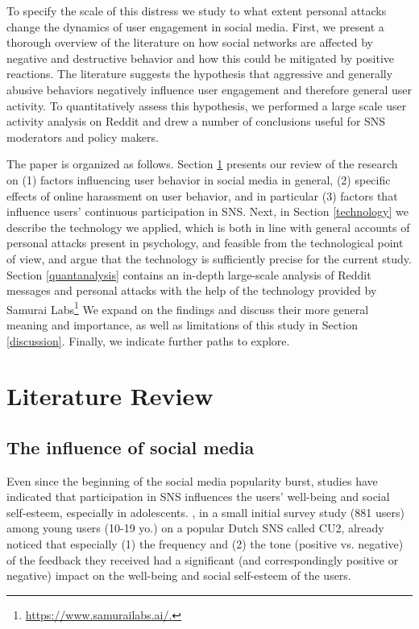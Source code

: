 \documentclass[a4paper,fleqn]{cas-dc}
\begin{document}
To specify the scale of this distress we study to what extent personal attacks change the dynamics of user engagement in social media. 
First, we present a thorough overview of the literature  on how social networks are affected by negative and destructive behavior and how this could be mitigated by positive reactions. The literature suggests the hypothesis that aggressive and generally abusive behaviors negatively influence user engagement and therefore general user activity. To quantitatively assess this hypothesis, we performed a large scale user activity analysis on Reddit and drew a number of conclusions useful for SNS moderators and policy makers.


The paper is organized as follows.
Section \ref{literaturereview} presents our review of the research on (1)  factors influencing user behavior in social media in general, (2) specific effects of online harassment on user behavior, and in particular (3) factors that influence users' continuous participation in SNS. 
Next, in Section \ref{technology} we describe the technology we applied, which is both in line with general accounts of personal attacks present in psychology, and feasible from the technological point of view, and argue that the technology is sufficiently precise for the current study. Section \ref{quantanalysis} contains an in-depth large-scale analysis of Reddit messages and personal attacks  with the help of the technology provided by \textsf{Samurai Labs}\footnote{\url{https://www.samurailabs.ai/.}} We expand on the findings and discuss their more general meaning and importance, as well as limitations of this study in Section \ref{discussion}. Finally,  we  indicate  further paths to explore.




\section{Literature Review}
\label{literaturereview}

\subsection{The influence of  social media}

Even since the beginning of the social media popularity burst, studies have indicated that  participation in SNS  influences  the users' well-being and social self-esteem, especially in adolescents. \citet{valkenburg2006friend}, in a small initial survey study (881 users) among young users (10-19 yo.) on a popular Dutch SNS called CU2, already noticed that especially  (1) the frequency  and (2) the tone (positive vs. negative) of the feedback they received had a significant (and correspondingly positive or negative) impact on the well-being and social self-esteem of the users.
\end{document}
